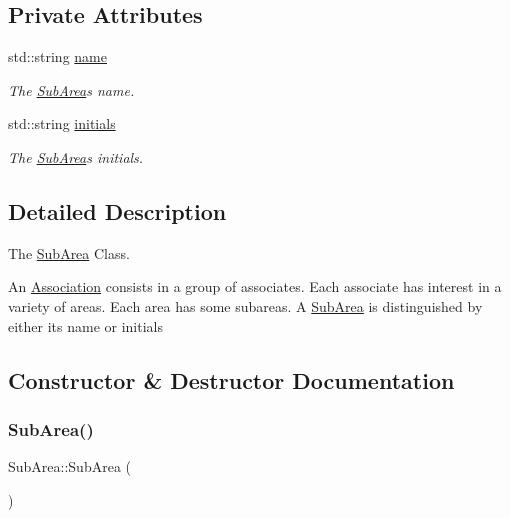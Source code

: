 \subsection*{Private Attributes}
\begin{DoxyCompactItemize}
\item 
std\+::string \hyperlink{classSubArea_aa1b0997da15caea7144ae73963da9f82}{name}
\begin{DoxyCompactList}\small\item\em The \hyperlink{classSubArea}{Sub\+Area}\textquotesingle{}s name. \end{DoxyCompactList}\item 
std\+::string \hyperlink{classSubArea_a3e0a456f5ce325e2a778a17d1929b5d0}{initials}
\begin{DoxyCompactList}\small\item\em The \hyperlink{classSubArea}{Sub\+Area}\textquotesingle{}s initials. \end{DoxyCompactList}\end{DoxyCompactItemize}


\subsection{Detailed Description}
The \hyperlink{classSubArea}{Sub\+Area} Class. 

An \hyperlink{classAssociation}{Association} consists in a group of associates. Each associate has interest in a variety of areas. Each area has some subareas. A \hyperlink{classSubArea}{Sub\+Area} is distinguished by either its name or initials 

\subsection{Constructor \& Destructor Documentation}
\mbox{\label{classSubArea_a9649b113a07cc887aec5bdf83b75666c}} 
\subsubsection{\texorpdfstring{Sub\+Area()}{SubArea()}\hspace{0.1cm}{\footnotesize\ttfamily [1/2]}}
{\footnotesize\ttfamily Sub\+Area\+::\+Sub\+Area (\begin{DoxyParamCaption}{ }\end{DoxyParamCaption})}



